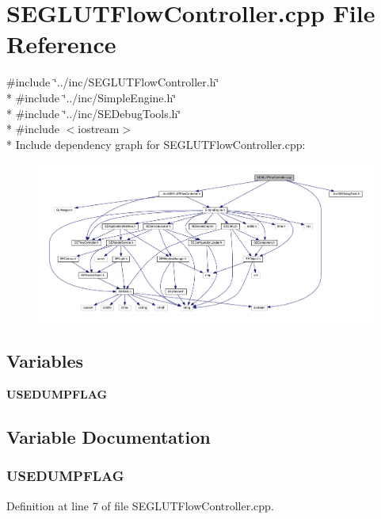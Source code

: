 \section{S\+E\+G\+L\+U\+T\+Flow\+Controller.\+cpp File Reference}
\label{_s_e_g_l_u_t_flow_controller_8cpp}
{\ttfamily \#include \char`\"{}../inc/\+S\+E\+G\+L\+U\+T\+Flow\+Controller.\+h\char`\"{}}\\*
{\ttfamily \#include \char`\"{}../inc/\+Simple\+Engine.\+h\char`\"{}}\\*
{\ttfamily \#include \char`\"{}../inc/\+S\+E\+Debug\+Tools.\+h\char`\"{}}\\*
{\ttfamily \#include $<$iostream$>$}\\*
Include dependency graph for S\+E\+G\+L\+U\+T\+Flow\+Controller.\+cpp\+:
\nopagebreak
\begin{figure}[H]
\begin{center}
\leavevmode
\includegraphics[width=350pt]{_s_e_g_l_u_t_flow_controller_8cpp__incl}
\end{center}
\end{figure}
\subsection*{Variables}
\begin{DoxyCompactItemize}
\item 
{\bf U\+S\+E\+D\+U\+M\+P\+F\+L\+A\+G}
\end{DoxyCompactItemize}


\subsection{Variable Documentation}
\subsubsection[{U\+S\+E\+D\+U\+M\+P\+F\+L\+A\+G}]{\setlength{\rightskip}{0pt plus 5cm}U\+S\+E\+D\+U\+M\+P\+F\+L\+A\+G}\label{_s_e_g_l_u_t_flow_controller_8cpp_adf706a38197b60bc3bf6b16557554414}


Definition at line 7 of file S\+E\+G\+L\+U\+T\+Flow\+Controller.\+cpp.

